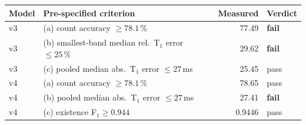 \begin{tabular}{llrl}
\toprule
Model & Pre-specified criterion & Measured & Verdict \\
\midrule
v3 & (a) count accuracy $\geq 78.1\,\%$ & 77.49 & \textbf{fail} \\
v3 & (b) smallest-band median rel.\ T$_1$ error $\leq 25\,\%$ & 29.62 & \textbf{fail} \\
v3 & (c) pooled median abs.\ T$_1$ error $\leq 27$\,ms & 25.45 & pass \\
v4 & (a) count accuracy $\geq 78.1\,\%$ & 78.65 & pass \\
v4 & (b) pooled median abs.\ T$_1$ error $\leq 27$\,ms & 27.41 & \textbf{fail} \\
v4 & (c) existence F$_1 \geq 0.944$ & 0.9446 & pass \\
\bottomrule
\end{tabular}
